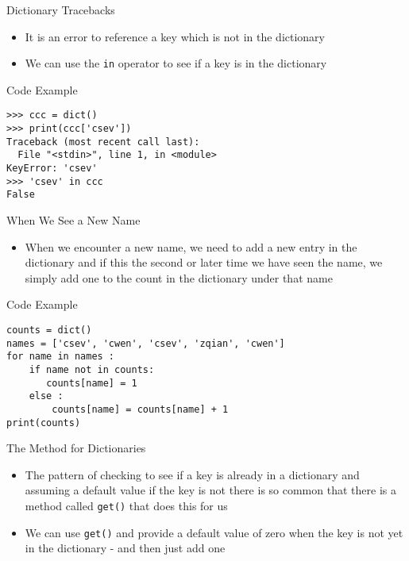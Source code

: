 \documentclass[serif, aspectratio=169]{beamer}
\begin{document}
\begin{frame}{Dictionary Tracebacks}
    \begin{itemize}
        \item It is an error to reference a key which is not in the dictionary
        \item We can use the \texttt{\color{red}in} operator to see if a key is in the dictionary
    \end{itemize}
\end{frame}

\begin{frame}[fragile]{Code Example}
    \begin{lstlisting}
>>> ccc = dict()
>>> print(ccc['csev'])
Traceback (most recent call last):
  File "<stdin>", line 1, in <module>
KeyError: 'csev'
>>> 'csev' in ccc
False
    \end{lstlisting}
\end{frame}

\begin{frame}{When We See a New Name}
    \begin{itemize}
        \item When we encounter a new name, we need to add a new entry in the dictionary and if this the second or later time we have seen the name, we simply add one to the count in the dictionary under that name
    \end{itemize}
\end{frame}

\begin{frame}[fragile]{Code Example}
    \begin{lstlisting}
counts = dict()
names = ['csev', 'cwen', 'csev', 'zqian', 'cwen']
for name in names :
    if name not in counts: 
       counts[name] = 1
    else :
        counts[name] = counts[name] + 1
print(counts)
    \end{lstlisting}
\end{frame}

\begin{frame}{The  Method for Dictionaries}
    \begin{itemize}
        \item The pattern of checking to see if a key is already in a dictionary and assuming a default value if the key is not there is so common that there is a method called \texttt{\color{red}get()} that does this for us
        \item We can use \texttt{\color{red}get()} and provide a default value of zero when the key is not yet in the dictionary - and then just add one
    \end{itemize}
\end{frame}
\end{document}
